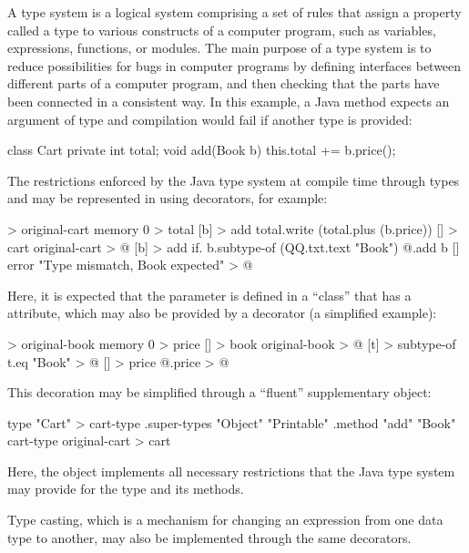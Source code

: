\documentclass[sigplan,nonacm]{acmart}
\begin{document}
A type system is a logical system comprising a set of rules that assign a property called a type to various constructs of a computer program, such as variables, expressions, functions, or modules.
The main purpose of a type system is to reduce possibilities for bugs in computer programs by defining interfaces between different parts of a computer program, and then checking that the parts have been connected in a consistent way.
In this example, a Java method  expects an argument of type  and compilation would fail if another type is provided:

\begin{ffcode}
class Cart {
  private int total;
  void add(Book b) {
    this.total += b.price();
  }
}
\end{ffcode}

The restrictions enforced by the Java type system at compile time through types  and  may be represented in \eolang{} using decorators, for example:

\begin{ffcode}
[] > original-cart
  memory 0 > total
  [b] > add
    total.write (total.plus (b.price))
[] > cart
  original-cart > @
  [b] > add
    if.
      b.subtype-of (QQ.txt.text "Book")
      @.add b
      []
        error "Type mismatch, Book expected" > @
\end{ffcode}

Here, it is expected that the parameter  is defined in a ``class'' that has a  attribute, which may also be provided by a decorator (a simplified example):

\begin{ffcode}
[] > original-book
  memory 0 > price
[] > book
  original-book > @
  [t] > subtype-of
    t.eq "Book" > @
  [] > price
    @.price > @
\end{ffcode}

This decoration may be simplified through a ``fluent'' supplementary object:

\begin{ffcode}
type "Cart" > cart-type
.super-types "Object" "Printable"
.method "add" "Book"
cart-type original-cart > cart
\end{ffcode}

Here, the  object implements all necessary restrictions that the Java type system may provide for the type  and its methods.

Type casting, which is a mechanism for changing an expression from one data type to another, may also be implemented through the same decorators.
\end{document}

